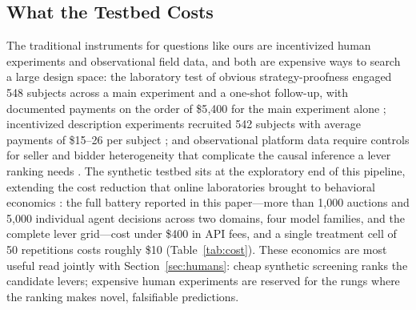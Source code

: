 \subsection{What the Testbed Costs}\label{sec:discussion-cost}

The traditional instruments for questions like ours are incentivized human experiments and observational field data, and both are expensive ways to search a large design space: the laboratory test of obvious strategy-proofness engaged 548 subjects across a main experiment and a one-shot follow-up, with documented payments on the order of \$5{,}400 for the main experiment alone \citep{li2017obviously}; incentivized description experiments recruited 542 subjects with average payments of \$15--26 per subject \citep{gonczarowski2024describing}; and observational platform data require controls for seller and bidder heterogeneity that complicate the causal inference a lever ranking needs \citep{manning2024automated}. The synthetic testbed sits at the exploratory end of this pipeline, extending the cost reduction that online laboratories brought to behavioral economics \citep{horton2011online}: the full battery reported in this paper---more than 1{,}000 auctions and 5{,}000 individual agent decisions across two domains, four model families, and the complete lever grid---cost under \$400 in API fees, and a single treatment cell of 50 repetitions costs roughly \$10 (Table~\ref{tab:cost}). These economics are most useful read jointly with Section~\ref{sec:humans}: cheap synthetic screening ranks the candidate levers; expensive human experiments are reserved for the rungs where the ranking makes novel, falsifiable predictions.

